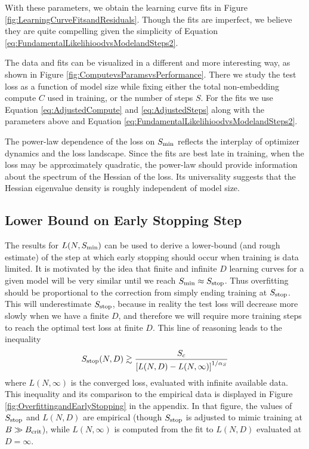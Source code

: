 \documentclass[english]{article}
\newcommand{\be}{\begin{equation}}
\newcommand{\ee}{\end{equation}}
\begin{document}
With these parameters, we obtain the learning curve fits in Figure \ref{fig:LearningCurveFitsandResiduals}.  Though the fits are imperfect, we believe they are quite compelling given the simplicity of Equation \eqref{eq:FundamentalLikelihioodvsModelandSteps2}.  

The data and fits can be visualized in a different and more interesting way, as shown in Figure \ref{fig:ComputevsParamsvsPerformance}.  There we study the test loss as a function of model size while fixing either the total non-embedding compute $C$ used in training, or the number of steps $S$.  For the fits we use Equation \eqref{eq:AdjustedCompute} and \eqref{eq:AdjustedSteps} along with the parameters above and Equation \eqref{eq:FundamentalLikelihioodvsModelandSteps2}.

The power-law dependence of the loss on $S_{\rm min}$ reflects the interplay of optimizer dynamics and the loss landscape.    Since the fits are best late in training, when the loss may be approximately quadratic, the power-law should provide information about the spectrum of the Hessian of the loss.  Its universality suggests that the Hessian eigenvalue density is roughly independent of model size.  

\subsection{Lower Bound on Early Stopping Step}
\label{sec:EarlyStop}

The results for $L(N,S_{\rm min})$ can be used to derive a lower-bound (and rough estimate) of the step at which early stopping should occur when training is data limited.  
It is motivated by the idea that finite and infinite $D$ learning curves for a given model will be very similar until we reach $S_{\rm min} \approx S_{\rm stop}$. Thus overfitting should be proportional to the correction from simply ending  training at $S_{\rm stop}$.  This will underestimate $S_{\rm stop}$, because in reality the test loss will decrease more slowly when we have a finite $D$, and therefore we will require more training steps to reach the optimal test loss at finite $D$.  
This line of reasoning leads to the inequality
\be
\label{eq:EarlyStopInequality}
S_{\rm stop}(N,D)  \gtrsim \frac{S_c}{\left[ L(N,D) - L(N, \infty) \right]^{1 / \alpha_S}}
\ee
where $L(N, \infty)$ is the converged loss, evaluated with infinite available data.  This inequality and its comparison to the empirical data is displayed in Figure \ref{fig:OverfittingandEarlyStopping} in the appendix.  In that figure, the values of $S_{\rm stop}$ and $L(N,D)$ are empirical (though $S_{\rm stop}$ is adjusted to mimic training at $B \gg B_{\rm crit}$), while $L(N, \infty)$ is computed from the fit to $L(N,D)$ evaluated at $D=\infty$.
\end{document}
